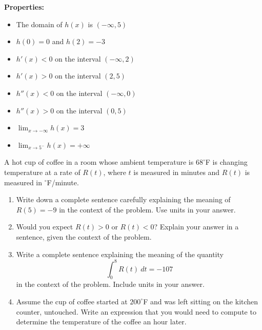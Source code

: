 \documentclass[12pt]{article}
\renewcommand{\emph}[1]{\textsf{\textbf{#1}}}
\let\ds\displaystyle
\newcounter{probcount}
\newcounter{subprobcount}
\def\problem#1{\setcounter{subprobcount}{0}%
\addtocounter{probcount}{1}{\emph{\arabic{probcount}.\hskip 1em(#1)}}\par}
\newenvironment{subproblems}{%
\begin{enumerate}%
\setcounter{enumi}{\value{subprobcount}}%
\renewcommand{\theenumi}{\emph{\alph{enumi}}}}%
{\setcounter{subprobcount}{\value{enumi}}\end{enumerate}}
\begin{document}
\emph{Properties:}
\begin{multicols}{2}
\begin{itemize}
\item The domain of $h(x)$ is $(-\infty, 5)$
\item $h(0)=0$ and $h(2)=-3$
\item $h'(x) < 0$ on the interval $(-\infty, 2)$
\item $h'(x) > 0$ on the interval $(2,5)$
\columnbreak
\item $h''(x) < 0$ on the interval $(-\infty, 0)$
\item $h''(x) > 0$ on the interval $(0,5)$
\item $\ds \lim_{x \to -\infty} h(x) = 3$
\item $\ds \lim_{x \to 5^-} h(x) = +\infty$
\end{itemize}
\end{multicols}



\newpage




\problem{10 points}A hot cup of coffee in a room whose ambient temperature is $68^{\circ}$F is changing temperature at a rate of $R(t)$, where $t$ is measured in minutes and $R(t)$ is measured in $^{\circ}$F/minute. 

\begin{subproblems}
\item Write down a complete sentence carefully explaining the meaning of $R(5) = -9$ in the context of the problem. Use units in your answer.

\vfill

\item Would you expect $R(t)>0$ or $R(t) <0$? Explain your answer in a sentence, given the context of the problem.

\vfill


\item Write a complete sentence explaining the meaning of the quantity \[\ds \int_{0}^{8} R(t) \ dt = -107\] in the context of the problem. Include units in your answer.

\vfill

\item Assume the cup of coffee started at $200^{\circ}$F and was left sitting on the kitchen counter, untouched. Write an expression that you would need to compute to determine the temperature of the coffee an hour later.

\vfill

\end{subproblems}
\end{document}
